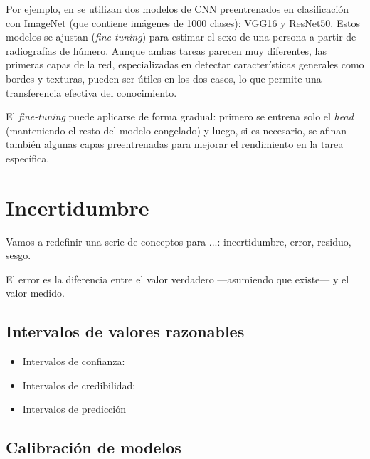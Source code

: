 Por ejemplo, en \cite{venema2022} se utilizan dos modelos de CNN preentrenados en clasificación con ImageNet 
(que contiene imágenes de 1000 clases): VGG16 y ResNet50. Estos modelos se ajustan (\textit{fine-tuning}) 
para estimar el sexo de una persona a partir de radiografías de húmero. Aunque ambas tareas parecen muy 
diferentes, las primeras capas de la red, especializadas en detectar características generales como bordes y 
texturas, pueden ser útiles en los dos casos, lo que permite una transferencia efectiva del conocimiento.

El \textit{fine-tuning} puede aplicarse de forma gradual: primero se entrena solo el \textit{head} 
(manteniendo el resto del modelo congelado) y luego, si es necesario, se afinan también algunas capas 
preentrenadas para mejorar el rendimiento en la tarea específica.



\section{Incertidumbre}





Vamos a redefinir una serie de conceptos para ...: incertidumbre, error, residuo, sesgo.

El error es la diferencia entre el valor verdadero ---asumiendo que existe--- y el valor medido.




\subsection{Intervalos de valores razonables}



\begin{itemize}
    \item Intervalos de confianza:
    \item Intervalos de credibilidad: 
    \item Intervalos de predicción
\end{itemize}




\subsection{Calibración de modelos}







